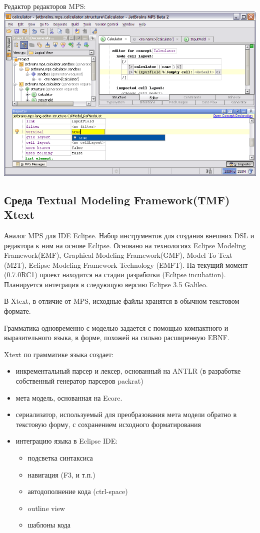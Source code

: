 \documentclass[a4paper,12pt]{article}
\begin{document}
\begin{center}
Редактор редакторов MPS:
\includegraphics[scale=0.4]{img/mps.png}
\end{center}

\subsection{Среда Textual Modeling Framework(TMF) Xtext}
Аналог MPS для IDE Eclipse.
Набор инструментов для создания внешних DSL и редактора к ним на основе Eclipse.
Основано на технологиях Eclipse Modeling Framework(EMF), Graphical Modeling
Framework(GMF), Model To Text (M2T), Eclipse Modeling Framework Technology
(EMFT). На текущий момент (0.7.0RC1) проект находится на стадии разработки
(Eclipse incubation). Планируется интеграция в следующую версию Eclipse 3.5
Galileo.

В Xtext, в отличие от MPS, исходные файлы хранятся в обычном текстовом формате.

Грамматика одновременно с моделью задается с помощью компактного и
выразительного языка, в форме, похожей на сильно расширенную EBNF.

Xtext по грамматике языка создает:
\begin{itemize}
  \item инкрементальный парсер и лексер, основанный на ANTLR (в разработке
  собственный генератор парсеров packrat)
  \item мета модель, основанная на Ecore.
  \item сериализатор, используемый для преобразования мета модели обратно в
  текстовую форму, с сохранением исходного форматирования 
  \item интеграцию языка в Eclipse IDE:
  \begin{itemize}
    \item подсветка синтаксиса
    \item навигация (F3, и т.п.)
    \item автодополнение кода (ctrl-space)
    \item outline view
    \item шаблоны кода
  \end{itemize}
\end{itemize}
\end{document}
